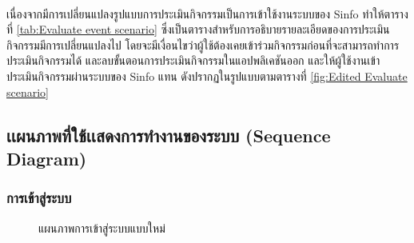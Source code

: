 \documentclass[14pt,oneside,openright,a4paper]{cpe-thai-project}
\begin{document}
  \\
  เนื่องจากมีการเปลี่ยนแปลงรูปแบบการประเมินกิจกรรมเป็นการเข้าใช้งานระบบของ Sinfo ทำให้ตารางที่ \ref{tab:Evaluate event scenario} ซึ่งเป็นตารางสำหรับการอธิบายรายละเอียดของการประเมินกิจกรรมมีการเปลี่ยนแปลงไป โดยจะมีเงื่อนไขว่าผู้ใช้ต้องเคยเข้าร่วมกิจกรรมก่อนที่จะสามารถทำการประเมินกิจกรรมได้
  และลบขั้นตอนการประเมินกิจกรรมในแอปพลิเคชันออก และให้ผู้ใช้งานเข้าประเมินกิจกรรมผ่านระบบของ Sinfo แทน ดังปรากฏในรูปแบบตามตารางที่ \ref{fig:Edited Evaluate scenario}
  \subsection{เเผนภาพที่ใช้เเสดงการทำงานของระบบ (Sequence Diagram)}
  
  \subsubsection{การเข้าสู่ระบบ} 
  \begin{figure}[H]\centering
    \setlength{\fboxrule}{0.5mm} %
    \setlength{\fboxsep}{0.5cm}
    \caption{แผนภาพการเข้าสู่ระบบแบบใหม่}\label{fig:editedloginsequencediagram}
   \end{figure}
\end{document}
